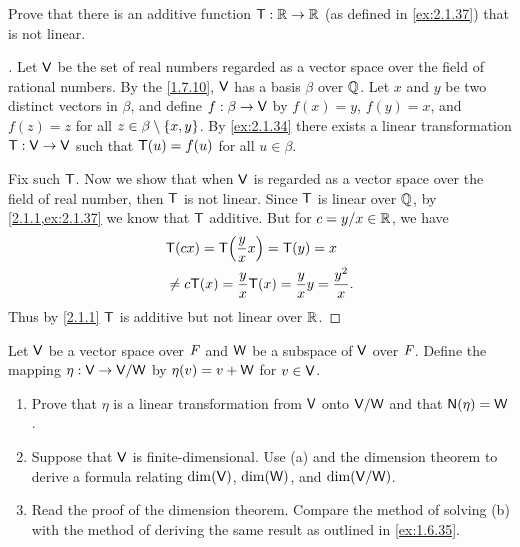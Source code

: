 \begin{ex}\label{ex:2.1.39}
  Prove that there is an additive function \(\mathsf{T} : \mathbb{R} \to \mathbb{R}\) (as defined in \cref{ex:2.1.37}) that is not linear.
\end{ex}

\begin{proof}[]
  Let \(\mathsf{V}\) be the set of real numbers regarded as a vector space over the field of rational numbers.
  By the \cref{1.7.10}, \(\mathsf{V}\) has a basis \(\beta\) over \(\mathbb{Q}\).
  Let \(x\) and \(y\) be two distinct vectors in \(\beta\), and define \(f : \beta \to \mathsf{V}\) by \(f(x) = y\), \(f(y) = x\), and \(f(z) = z\) for all \(z \in \beta \setminus \left\lbrace x, y\right\rbrace\).
  By \cref{ex:2.1.34} there exists a linear transformation \(\mathsf{T} : \mathsf{V} \to \mathsf{V}\) such that \(\mathsf{T}(u) = f(u)\) for all \(u \in \beta\).

  Fix such \(\mathsf{T}\).
  Now we show that when \(\mathsf{V}\) is regarded as a vector space over the field of real number, then \(\mathsf{T}\) is not linear.
  Since \(\mathsf{T}\) is linear over \(\mathbb{Q}\), by \cref{2.1.1,ex:2.1.37} we know that \(\mathsf{T}\) additive.
  But for \(c = y / x \in \mathbb{R}\), we have
  \begin{align*}
     & \T(cx) = \T\pa{\frac{y}{x} x} = \T(y) = x                         \\
     & \neq c \T(x) = \frac{y}{x} \T(x) = \frac{y}{x} y = \frac{y^2}{x}.
  \end{align*}
  Thus by \cref{2.1.1} \(\mathsf{T}\) is additive but not linear over \(\mathbb{R}\).
\end{proof}

\begin{ex}\label{ex:2.1.40}
  Let \(\mathsf{V}\) be a vector space over \(\mathit{F}\) and \(\mathsf{W}\) be a subspace of \(\mathsf{V}\) over \(\mathit{F}\).
  Define the mapping \(\eta : \mathsf{V} \to \mathsf{V} / \mathsf{W}\) by \(\eta(v) = v + \mathsf{W}\) for \(v \in \mathsf{V}\).
  \begin{enumerate}
    \item Prove that \(\eta\) is a linear transformation from \(\mathsf{V}\) onto \(\mathsf{V} / \mathsf{W}\) and that \(\ns{\eta} = \W\).
    \item Suppose that \(\mathsf{V}\) is finite-dimensional.
          Use (a) and the dimension theorem to derive a formula relating \(\dim(\mathsf{V})\), \(\dim(\mathsf{W})\), and \(\dim(\mathsf{V} / \mathsf{W})\).
    \item Read the proof of the dimension theorem.
          Compare the method of solving (b) with the method of deriving the same result as outlined in \cref{ex:1.6.35}.
  \end{enumerate}
\end{ex}

